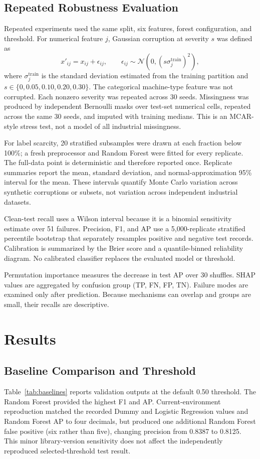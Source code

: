 \documentclass[conference]{IEEEtran}
\begin{document}
\subsection{Repeated Robustness Evaluation}
Repeated experiments used the same split, six features, forest configuration, and threshold. For numerical feature $j$, Gaussian corruption at severity $s$ was defined as
\begin{equation}
x'_{ij}=x_{ij}+\epsilon_{ij},\qquad
\epsilon_{ij}\sim\mathcal{N}\!\left(0,\left(s\sigma^{\mathrm{train}}_j\right)^2\right),
\label{eq:noise}
\end{equation}
where $\sigma^{\mathrm{train}}_j$ is the standard deviation estimated from the training partition and $s\in\{0,0.05,0.10,0.20,0.30\}$. The categorical machine-type feature was not corrupted. Each nonzero severity was repeated across 30 seeds. Missingness was produced by independent Bernoulli masks over test-set numerical cells, repeated across the same 30 seeds, and imputed with training medians. This is an MCAR-style stress test, not a model of all industrial missingness.

For label scarcity, 20 stratified subsamples were drawn at each fraction below 100\%; a fresh preprocessor and Random Forest were fitted for every replicate. The full-data point is deterministic and therefore reported once. Replicate summaries report the mean, standard deviation, and normal-approximation 95\% interval for the mean. These intervals quantify Monte Carlo variation across synthetic corruptions or subsets, not variation across independent industrial datasets.

Clean-test recall uses a Wilson interval because it is a binomial sensitivity estimate over 51 failures. Precision, F1, and AP use a 5,000-replicate stratified percentile bootstrap that separately resamples positive and negative test records. Calibration is summarized by the Brier score and a quantile-binned reliability diagram. No calibrated classifier replaces the evaluated model or threshold.

Permutation importance measures the decrease in test AP over 30 shuffles. SHAP values are aggregated by confusion group (TP, FN, FP, TN). Failure modes are examined only after prediction. Because mechanisms can overlap and groups are small, their recalls are descriptive.

\section{Results}
\subsection{Baseline Comparison and Threshold}
Table~\ref{tab:baselines} reports validation outputs at the default 0.50 threshold. The Random Forest provided the highest F1 and AP. Current-environment reproduction matched the recorded Dummy and Logistic Regression values and Random Forest AP to four decimals, but produced one additional Random Forest false positive (six rather than five), changing precision from 0.8387 to 0.8125. This minor library-version sensitivity does not affect the independently reproduced selected-threshold test result.
\end{document}
